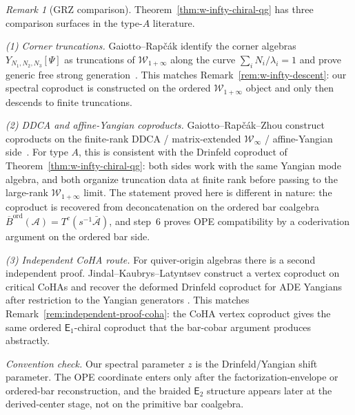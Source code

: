 \documentclass[11pt,reqno]{amsart}
\theoremstyle{definition}
\theoremstyle{remark}
\newtheorem{remark}[theorem]{Remark}
\newcommand{\cA}{\mathcal{A}}
\newcommand{\cW}{\mathcal{W}}
\newcommand{\Eone}{\mathsf{E}_{1}}
\newcommand{\Etwo}{\mathsf{E}_{2}}
\newcommand{\Barord}{\overline{B}^{\mathrm{ord}}}
\numberwithin{equation}{section}
\begin{document}
\begin{remark}[GRZ comparison]
Theorem~\ref{thm:w-infty-chiral-qg} has three comparison surfaces
in the type-$A$ literature.

\smallskip
\noindent\emph{(1) Corner truncations.}
Gaiotto--Rap\v{c}\'ak identify the corner algebras
$Y_{N_1,N_2,N_3}[\Psi]$ as truncations of
$\cW_{1+\infty}$ along the curve
$\sum_i N_i/\lambda_i = 1$ and prove generic free strong
generation~\cite[Theorem~3.1 and eq.~3.35]{gaiotto-rapchak}.
This matches Remark~\ref{rem:w-infty-descent}: our spectral
coproduct is constructed on the ordered
$\cW_{1+\infty}$ object and only then descends to finite
truncations.

\smallskip
\noindent\emph{(2) DDCA and affine-Yangian coproducts.}
Gaiotto--Rap\v{c}\'ak--Zhou construct coproducts on the
finite-rank DDCA / matrix-extended $\cW_\infty$ /
affine-Yangian side~\cite[\S\S5--7]{GRZ25}. For type $A$,
this is consistent with the Drinfeld coproduct of
Theorem~\ref{thm:w-infty-chiral-qg}: both sides work with the
same Yangian mode algebra, and both organize truncation data at
finite rank before passing to the large-rank
$\cW_{1+\infty}$ limit. The statement proved here is different in
nature: the coproduct is recovered from deconcatenation on the
ordered bar coalgebra
$\Barord(\cA) = T^c(s^{-1}\bar{\cA})$, and step~6 proves OPE
compatibility by a coderivation argument on the ordered bar side.

\smallskip
\noindent\emph{(3) Independent CoHA route.}
For quiver-origin algebras there is a second independent proof.
Jindal--Kaubrys--Latyntsev construct a vertex coproduct on
critical CoHAs and recover the deformed Drinfeld coproduct for
ADE Yangians after restriction to the Yangian generators
\cite{JKL26}. This matches
Remark~\ref{rem:independent-proof-coha}: the CoHA vertex
coproduct gives the same ordered $\Eone$-chiral coproduct that
the bar-cobar argument produces abstractly.

\smallskip
\noindent\emph{Convention check.}
Our spectral parameter $z$ is the Drinfeld/Yangian shift
parameter. The OPE coordinate enters only after the
factorization-envelope or ordered-bar reconstruction, and the
braided $\Etwo$ structure appears later at the derived-center
stage, not on the primitive bar coalgebra.
\end{remark}
\end{document}
